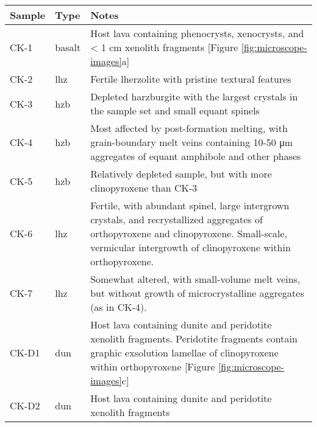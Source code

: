 \begin{tabularx}{\textwidth}{l l X}
\toprule
  Sample & Type & Notes \\
\midrule
  CK-1 & basalt & Host lava containing phenocrysts, xenocrysts, and < 1 cm xenolith fragments [Figure \ref{fig:microscope-images}a] \\
  CK-2 & lhz & Fertile lherzolite with pristine textural features \\
  CK-3 & hzb & Depleted harzburgite with the largest crystals in the sample set and small equant spinels \\
  CK-4 & hzb & Most affected by post-formation melting, with grain-boundary melt veins containing
               10-50 \si{\micro\meter} aggregates of equant amphibole and other phases \\
  CK-5 & hzb & Relatively depleted sample, but with more clinopyroxene than CK-3 \\
  CK-6 & lhz & Fertile, with abundant spinel, large intergrown crystals, and recrystallized aggregates of orthopyroxene and clinopyroxene. Small-scale,
               vermicular intergrowth of clinopyroxene within orthopyroxene. \\
  CK-7 & lhz & Somewhat altered, with small-volume melt veins, but without growth of microcrystalline aggregates (as in CK-4). \\
  CK-D1 & dun & Host lava containing dunite and peridotite xenolith fragments. Peridotite fragments contain graphic exsolution
               lamellae of  clinopyroxene within orthopyroxene [Figure \ref{fig:microscope-images}c] \\
  CK-D2 & dun & Host lava containing dunite and peridotite xenolith fragments \\
\bottomrule
\end{tabularx}
